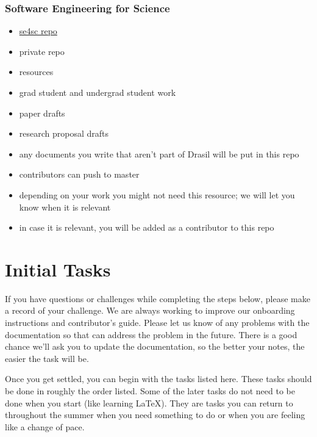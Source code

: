 \documentclass[12pt]{article}
\begin{document}
\subsubsection{Software Engineering for Science}
\begin{itemize}
\item \href{https://gitlab.cas.mcmaster.ca/SEforSC/se4sc} {se4sc repo}
\item private repo
\item resources 
\item grad student and undergrad student work
\item paper drafts
\item research proposal drafts
\item any documents you write that aren't part of Drasil will be put in this repo
\item contributors can push to master
\item depending on your work you might not need this resource; we will let you
know when it is relevant
\item in case it is relevant, you will be added as a contributor to this repo
\end{itemize}

\section{Initial Tasks}

If you have questions or challenges while completing the steps below, please
make a record of your challenge.  We are always working to improve our
onboarding instructions and contributor's guide.  Please let us know of any
problems with the documentation so that can address the problem in the future.
There is a good chance we'll ask you to update the documentation, so the better
your notes, the easier the task will be.

Once you get settled, you can begin with the tasks listed here.  These tasks
should be done in roughly the order listed.  Some of the later tasks do not need
to be done when you start (like learning LaTeX).  They are tasks you can return
to throughout the summer when you need something to do or when you are feeling
like a change of pace.
\end{document}
